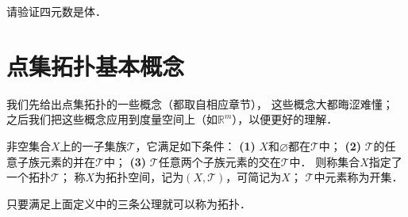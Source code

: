 %
%


\begin{exercise}
	请验证四元数是体．
\end{exercise}

\section{点集拓扑基本概念}\label{chtop:sec_topology}
我们先给出点集拓扑的一些概念（都取自\parencite{munkres-2000-topology}相应章节），
这些概念大都晦涩难懂；
之后我们把这些概念应用到度量空间上（如$\mathbb{R}^m$），以便更好的理解．

\begin{definition}\label{chtop:def_top}
    非空集合$X$上的一子集族$\mathscr{T}$，它满足如下条件：
    {\bfseries (1)} $X$和$\varnothing$都在$\mathscr{T}$中；
    {\bfseries (2)} $\mathscr{T}$的任意子族元素的并在$\mathscr{T}$中；
    {\bfseries (3)} $\mathscr{T}$任意两个子族元素的交在$\mathscr{T}$中．
    则称集合$X$指定了一个{\heiti 拓扑}$\mathscr{T}$；
    称$X$为{\heiti 拓扑空间}，记为$(X,\mathscr{T})$，可简记为$X$；
    $\mathscr{T}$中元素称为{\heiti 开集}．
      
\end{definition}

只要满足上面定义中的三条公理就可以称为拓扑．

